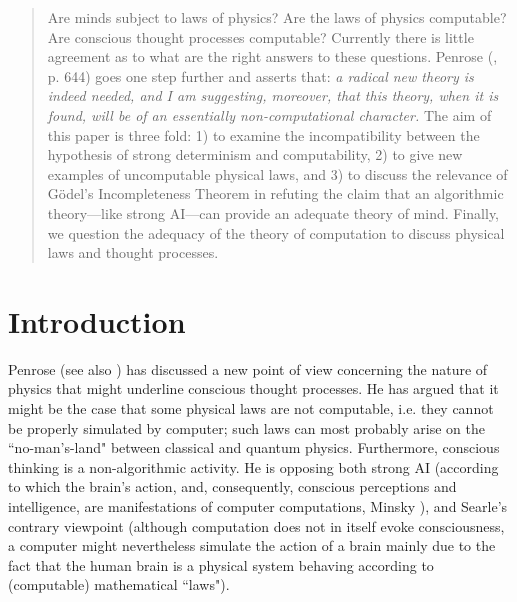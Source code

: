 \thispagestyle{empty}
\begin{abstract}
Are minds subject to laws of physics? Are
 the laws of physics computable? Are conscious thought processes computable?
Currently there is little agreement as to what are the right answers to these
questions.
Penrose (\cite{penrose0}, p. 644) goes one step further and asserts that:
{\it  a radical new theory is indeed needed, and I
am suggesting, moreover, that this theory, when it is found, will be
of an essentially non-computational character.}
The aim of this paper is three fold: 1) to examine the incompatibility between
 the hypothesis of strong determinism and computability,  2) to give
new examples of uncomputable physical laws, and 3) to discuss the relevance of
G\" odel's Incompleteness Theorem in  refuting  the claim
that an algorithmic theory---like strong AI---can provide an adequate
theory of mind. Finally, we question the adequacy of the theory
of computation to   discuss physical laws and thought processes.
\end{abstract}

\section{Introduction}
Penrose \cite{penrose} (see also \cite{penrose0}) has discussed a new point
of view concerning
the nature of physics that might underline conscious thought processes.
He has argued that it might be the case that some physical
laws are
not computable, i.e. they cannot be properly simulated by computer; such
laws can
most probably arise on the ``no-man's-land" between classical and quantum
physics.
Furthermore, conscious thinking is a non-algorithmic activity. He is
opposing both
 strong AI  (according to which the brain's action, and, consequently,
conscious perceptions and intelligence, are manifestations of computer
computations,
Minsky \cite{minsky,minsky1}), and Searle's   \cite{searle}
contrary viewpoint (although  computation does
not  in itself evoke consciousness,   a computer might nevertheless
simulate the action of a brain
 mainly due to the fact that the human brain is a
physical system
behaving according to (computable)  mathematical ``laws").



